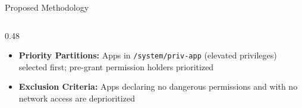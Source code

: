 \documentclass[aspectratio=169]{beamer}
\begin{document}
\begin{frame}{Proposed Methodology}
\begin{columns}[T]
\begin{column}{0.48\textwidth}
\begin{itemize}
            \item \textbf{Priority Partitions:}
                  Apps in \texttt{/system/priv-app} (elevated privileges)
                  selected first; pre-grant permission holders prioritized

            \item \textbf{Exclusion Criteria:}
                  Apps declaring no dangerous permissions and with no
                  network access are deprioritized
        \end{itemize}
    \end{column}
\end{columns}
\end{frame}


\end{document}
